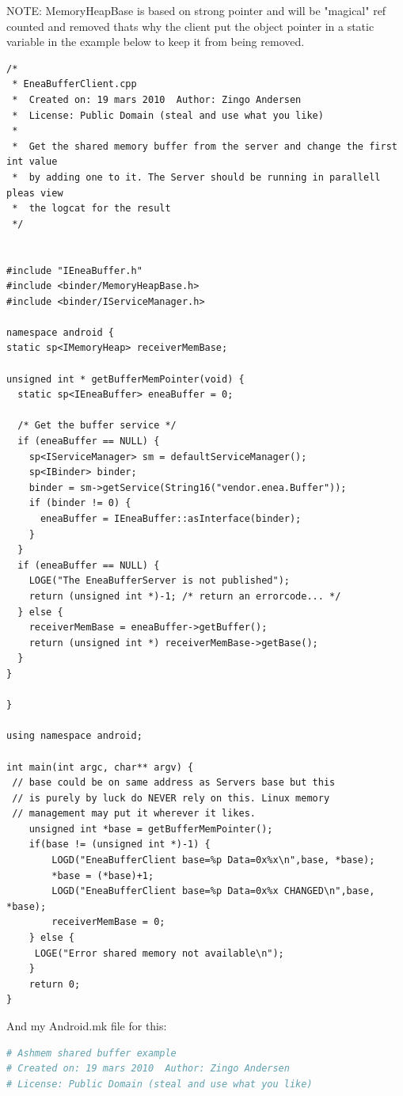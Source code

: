 \documentclass[a4paper,11pt]{article}
\begin{document}
\begin{appendices}
NOTE: MemoryHeapBase is based on strong pointer and will be "magical" ref
counted and removed thats why the client put the object pointer in a static
variable in the example below to keep it from being removed.
\begin{lstlisting}[caption=EneaBufferClient.cpp, label={EneaBufferClient}]
/*
 * EneaBufferClient.cpp
 *  Created on: 19 mars 2010  Author: Zingo Andersen
 *  License: Public Domain (steal and use what you like)
 *
 *  Get the shared memory buffer from the server and change the first int value
 *  by adding one to it. The Server should be running in parallell pleas view
 *  the logcat for the result
 */


#include "IEneaBuffer.h"
#include <binder/MemoryHeapBase.h>
#include <binder/IServiceManager.h>

namespace android {
static sp<IMemoryHeap> receiverMemBase;

unsigned int * getBufferMemPointer(void) {
  static sp<IEneaBuffer> eneaBuffer = 0;

  /* Get the buffer service */
  if (eneaBuffer == NULL) {
    sp<IServiceManager> sm = defaultServiceManager();
    sp<IBinder> binder;
    binder = sm->getService(String16("vendor.enea.Buffer"));
    if (binder != 0) {
      eneaBuffer = IEneaBuffer::asInterface(binder);
    }
  }
  if (eneaBuffer == NULL) {
    LOGE("The EneaBufferServer is not published");
    return (unsigned int *)-1; /* return an errorcode... */
  } else {
    receiverMemBase = eneaBuffer->getBuffer();
    return (unsigned int *) receiverMemBase->getBase();
  }
}

}

using namespace android;

int main(int argc, char** argv) {
 // base could be on same address as Servers base but this
 // is purely by luck do NEVER rely on this. Linux memory
 // management may put it wherever it likes.
    unsigned int *base = getBufferMemPointer();
    if(base != (unsigned int *)-1) {
        LOGD("EneaBufferClient base=%p Data=0x%x\n",base, *base);
        *base = (*base)+1;
        LOGD("EneaBufferClient base=%p Data=0x%x CHANGED\n",base, *base);
        receiverMemBase = 0;
    } else {
     LOGE("Error shared memory not available\n");
    }
    return 0;
}

\end{lstlisting}
And my Android.mk file for this:
\begin{lstlisting}[caption=Android.mk,language=make]
# Ashmem shared buffer example
# Created on: 19 mars 2010  Author: Zingo Andersen
# License: Public Domain (steal and use what you like)


\end{lstlisting}
\end{appendices}
\end{document}
